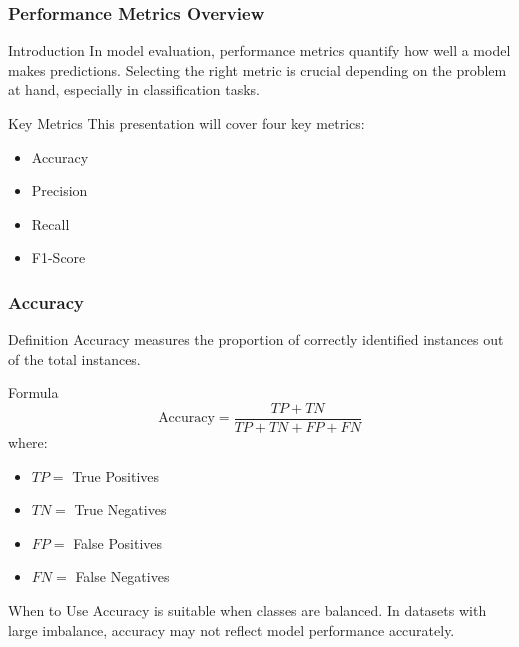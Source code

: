 \documentclass[aspectratio=169]{beamer}
\begin{document}
\begin{frame}[fragile]
    \frametitle{Performance Metrics Overview}
    \begin{block}{Introduction}
        In model evaluation, performance metrics quantify how well a model makes predictions. Selecting the right metric is crucial depending on the problem at hand, especially in classification tasks.
    \end{block}
    \begin{block}{Key Metrics}
        This presentation will cover four key metrics:
        \begin{itemize}
            \item Accuracy
            \item Precision
            \item Recall
            \item F1-Score
        \end{itemize}
    \end{block}
\end{frame}

\begin{frame}[fragile]
    \frametitle{Accuracy}
    \begin{block}{Definition}
        Accuracy measures the proportion of correctly identified instances out of the total instances.
    \end{block}
    \begin{block}{Formula}
        \begin{equation}
            \text{Accuracy} = \frac{TP + TN}{TP + TN + FP + FN}
        \end{equation}
        where:
        \begin{itemize}
            \item \(TP =\) True Positives
            \item \(TN =\) True Negatives
            \item \(FP =\) False Positives
            \item \(FN =\) False Negatives
        \end{itemize}
    \end{block}
    \begin{block}{When to Use}
        Accuracy is suitable when classes are balanced. In datasets with large imbalance, accuracy may not reflect model performance accurately.
    \end{block}
\end{frame}
\end{document}
